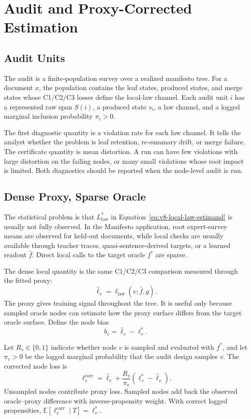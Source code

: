 \section{Audit and Proxy-Corrected Estimation}
\label{sec:v8-audit-certificate}

\subsection{Audit Units}

The audit is a finite-population survey over a realized manifesto tree. For a
document \(x\), the population contains the leaf states, produced states, and
merge states whose C1/C2/C3 losses define the local-law channel. Each audit
unit \(i\) has a represented raw span \(S(i)\), a produced state \(s_i\), a
law channel, and a logged marginal inclusion probability \(\pi_i>0\).

The first diagnostic quantity is a violation rate for each law channel. It
tells the analyst whether the problem is leaf retention, re-summary drift, or
merge failure. The certificate quantity is mean distortion. A run can have few
violations with large distortion on the failing nodes, or many small
violations whose root impact is limited. Both diagnostics should be reported
when the node-level audit is run.

\subsection{Dense Proxy, Sparse Oracle}

The statistical problem is that \(L_{\mathrm{law}}^\ast\) in
Equation~\eqref{eq:v8-local-law-estimand} is usually not fully observed. In
the Manifesto application, root expert-survey means are observed for held-out
documents, while local checks are usually available through teacher traces,
quasi-sentence-derived targets, or a learned readout \(\widehat f\). Direct
local calls to the target oracle \(f^\ast\) are sparse.

The dense local quantity is the same C1/C2/C3 comparison measured through the
fitted proxy:
\[
  \widehat\ell_v
  =
  \ell_{\mathrm{law}}(v;\widehat f,g).
\]
The proxy gives training signal throughout the tree. It is useful only because
sampled oracle nodes can estimate how the proxy surface differs from the
target oracle surface. Define the node bias
\[
  b_v=\widehat\ell_v-\ell_v^\ast .
\]

Let \(R_v\in\{0,1\}\) indicate whether node \(v\) is sampled and evaluated
with \(f^\ast\), and let \(\pi_v>0\) be the logged marginal probability that
the audit design samples \(v\). The corrected node loss is
\begin{equation}
\label{eq:v8-corrected-node-loss}
  \ell_v^{\mathrm{corr}}
  =
  \widehat\ell_v
  +
  \frac{R_v}{\pi_v}
  \left(\ell_v^\ast-\widehat\ell_v\right).
\end{equation}
Unsampled nodes contribute proxy loss. Sampled nodes add back the observed
oracle--proxy difference with inverse-propensity weight. With correct logged
propensities, \(\mathbb E[\ell_v^{\mathrm{corr}}\mid T]=\ell_v^\ast\).

